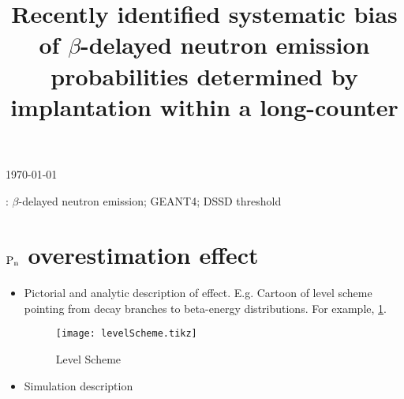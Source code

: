 \documentclass[12pt]{iopart}
\begin{document}
\title[$\rm{P}_{n}$ bias due to $\beta$-detection threshold]{Recently identified systematic bias of $\beta$-delayed neutron emission probabilities determined by implantation within a long-counter}



\vspace{10pt}
\begin{indented}
\item[]\today
\end{indented}




%
\vspace{2pc}
: $\beta$-delayed neutron emission; GEANT4; DSSD threshold

\submitto{\jpg}
%
\maketitle
% 
%



\section{$\rm{P}_{n}$ overestimation effect}
 \begin{itemize}   
  \item Pictorial and analytic description of effect. E.g. Cartoon of level scheme pointing from decay branches to beta-energy distributions. For example, \cref{fig:levelScheme}.
  
\begin{figure}[ht]
	\texttt{[image: levelScheme.tikz]}
	\caption{Level Scheme}
	\label{fig:levelScheme} 	
\end{figure}

  \item Simulation description
 \end{itemize}
 



  





\end{document}
